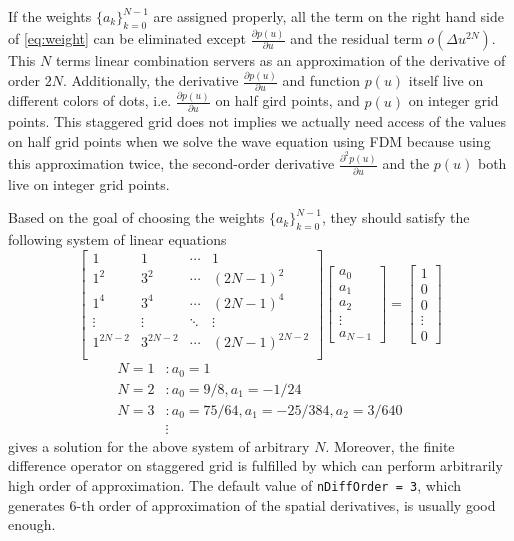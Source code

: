 \documentclass[11pt,titlepage]{article}
\theoremstyle{plain}
\theoremstyle{definition}
\theoremstyle{remark}
\numberwithin{equation}{section}
\begin{document}
If the weights $\{ a_k\}_{k=0}^{N-1}$ are assigned properly, all the term on the right hand side of \eqref{eq:weight} can be eliminated except $\frac{\partial p(u)}{\partial u}$ and the residual term $o(\Delta u^{2N})$. This $N$ terms linear combination servers as an approximation of the derivative of order $2N$. Additionally, the derivative $\frac{\partial p(u)}{\partial u}$ and function $p(u)$ itself live on different colors of dots, i.e. $\frac{\partial p(u)}{\partial u}$ on half gird points, and $p(u)$ on integer grid points. This staggered grid does not implies we actually need access of the values on half grid points when we solve the wave equation using FDM because using this approximation twice, the second-order derivative $\frac{\partial^2 p(u)}{\partial u}$ and the $p(u)$ both live on integer grid points.

Based on the goal of choosing the weights $\{a_k\}_{k=0}^{N-1}$, they should satisfy the following system of linear equations
\begin{equation*}
\begin{bmatrix}
  1 & 1 & \cdots & 1\\
  1^2 & 3^2 & \cdots & (2N-1)^2\\
  1^4 & 3^4 & \cdots & (2N-1)^4\\
  \vdots & \vdots & \ddots & \vdots\\
  1^{2N-2} & 3^{2N-2} & \cdots & (2N-1)^{2N-2}\\
\end{bmatrix}
\begin{bmatrix}
  a_0 \\ a_1 \\ a_2 \\ \vdots \\ a_{N-1}
\end{bmatrix}
=
\begin{bmatrix}
  1 \\ 0 \\ 0 \\ \vdots \\ 0
\end{bmatrix}
\end{equation*}
\begin{equation*}
  \begin{aligned}
  N = 1&: a_0 = 1\\
  N = 2&: a_0 = 9/8, a_1 = -1/24\\
  N = 3&: a_0 = 75/64, a_1 = -25/384, a_2 = 3/640\\
  &\vdots
  \end{aligned}
\end{equation*}
 gives a solution for the above system of arbitrary $N$. Moreover, the finite difference operator on staggered grid is fulfilled by  which can perform arbitrarily high order of approximation. The default value of \texttt{nDiffOrder = 3}, which generates 6-th order of approximation of the spatial derivatives, is usually good enough.
\end{document}
